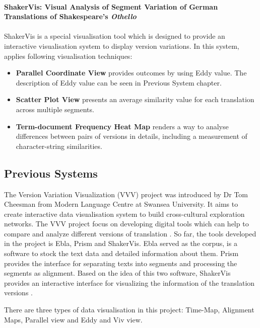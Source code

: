\paragraph{ShakerVis: Visual Analysis of Segment Variation of German Translations of Shakespeare’s \emph{Othello}}
\paragraph[]{} ShakerVis \cite{Geng2015} is a special visualisation tool which is designed to provide an interactive visualisation system to display version variations. In this system, \cite{Geng2015} applies following visualisation techniques:

\begin{itemize}
	\item \textbf{Parallel Coordinate View} provides outcomes by using Eddy value. The description of Eddy value can be seen in Previous System chapter.
	\item \textbf{Scatter Plot View} presents an average similarity value for each translation across multiple segments.
	\item \textbf{Term-document Frequency Heat Map} renders a way to analyse differences between pairs of versions in details, including a measurement of character-string similarities.
	
\end{itemize}

\subsection{Previous Systems}

The Version Variation Visualization (VVV) project was introduced by Dr Tom Cheesman from Modern Language Centre at Swansea University. It aims to create interactive data visualisation system to build cross-cultural exploration networks. The VVV project focus on developing digital tools which can help to compare and analyze different versions of translation \cite{Cheesman2012}. So far, the tools developed in the project is Ebla, Prism and ShakerVis. Ebla served as the corpus, is a software to stock the text data and detailed information about them. Prism provides the interface for separating texts into segments and processing the segments as alignment. Based on the idea of this two software, ShakerVis provides an interactive interface for visualizing the information of the translation versions \cite{Geng2015}.

There are three types of data visualisation in this project: Time-Map, Alignment Maps, Parallel view and Eddy and Viv view. 

